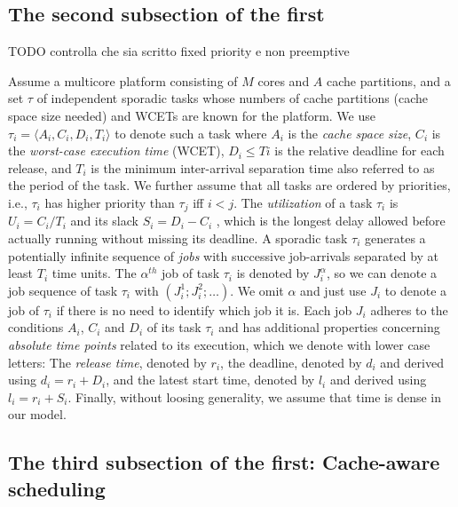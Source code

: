 \documentclass[a4paper,10pt]{article}
\begin{document}
\begin{multicols}{2}
\subsection{The second subsection of the first}

TODO controlla che sia scritto fixed priority e non preemptive

Assume a multicore platform consisting of $M$ cores and $A$ cache partitions, and a set $\tau$ of independent sporadic tasks
whose numbers of cache partitions (cache space size needed) and WCETs are known for the platform. We use $\tau_i = \langle A_i,C_i,D_i,T_i \rangle$
to denote such a task where $A_i$ is the \textit{cache space size}, $C_i$ is the \textit{worst-case execution time} (WCET), $D_i \le Ti$ is the 
relative deadline for each release, and $T_i$ is the minimum inter-arrival separation time also referred to as the period of the task. We further assume
that all tasks are ordered by priorities, i.e., $\tau_i$ has higher priority than $\tau_j$ iff $i < j$. The \textit{utilization} of a task $\tau_i$ is
$U_i = C_i/T_i$ and its slack $S_i = D_i - C_i$ , which is the longest delay allowed before actually running without missing its
deadline. A sporadic task $\tau_i$ generates a potentially infinite sequence of \textit{jobs} with successive job-arrivals separated by at least $T_i$
time units. The $\alpha^{th}$ job of task $\tau_i$ is denoted by $J_{i}^\alpha$, so we can denote a job sequence of task $\tau_i$
with $(J_{i}^1; J_{i}^2;\dots{})$. We omit $\alpha$ and just use $J_i$ to denote a job of $\tau_i$ if there is no need to identify which job it is. Each
job $J_i$ adheres to the conditions $A_i$, $C_i$ and $D_i$ of its task $\tau_i$ and has additional properties concerning \textit{absolute time points} 
related to its execution, which we denote with lower case letters: The \textit{release time}, denoted by $r_i$, the deadline, denoted by $d_i$
and derived using $d_i = r_i + D_i$, and the latest start time, denoted by $l_i$ and derived using $l_i = r_i + S_i$.
Finally, without loosing generality, we assume that time is dense in our model.

\subsection{The third subsection of the first: Cache-aware scheduling}


\end{multicols}
\end{document}
